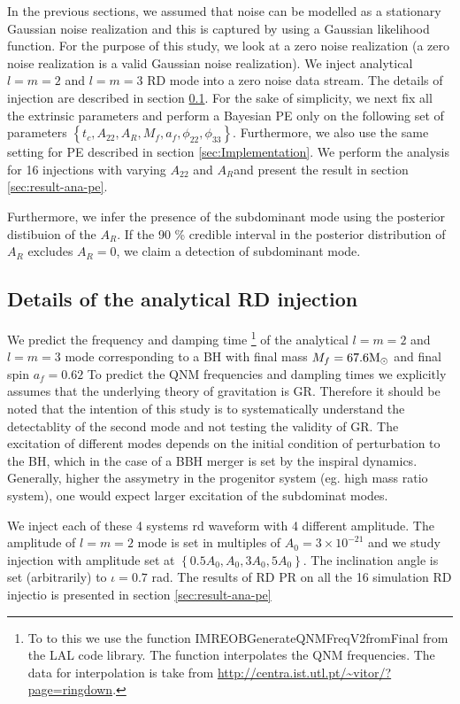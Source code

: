 In the previous sections, we assumed that noise can be modelled as a stationary Gaussian noise realization and this is captured by using a Gaussian likelihood function. For the purpose of this study, we look at a zero noise realization (a zero noise realization is a valid Gaussian noise realization). We inject analytical $l=m=2$ and $l=m=3$ RD mode into a zero noise data stream. The details of injection are described in section \ref{sec:details-of-ana-RD}. For the sake of simplicity, we next fix all the extrinsic parameters and perform a Bayesian PE only on the following set of parameters $\left\lbrace  t_{c}, A_{22}, A_{R}, M_{f}, a_{f}, \phi_{22}, \phi_{33 } \right\rbrace $. Furthermore, we also use the same setting for PE described in section \ref{sec:Implementation}.  We perform the analysis for 16 injections with varying $A_{22}$ and $A_{R}$and present the result in section \ref{sec:result-ana-pe}.

Furthermore, we infer the presence of the subdominant mode using the posterior distibuion of the $A_{R}$. If the 90 \% credible interval in the posterior distribution of $A_{R}$ excludes $A_{R} =0$, we claim a detection of subdominant mode. 

\subsection{Details of the analytical RD injection}
\label{sec:details-of-ana-RD}
We predict the frequency and damping time \footnote{To to this we use the function IMREOBGenerateQNMFreqV2fromFinal from the LAL code library. The function interpolates the QNM frequencies. The data for interpolation is take from \url{http://centra.ist.utl.pt/~vitor/?page=ringdown}.} of the analytical $l=m=2$ and $l=m=3$ mode corresponding to a BH with final mass $M_{f}=67.6 \mathrm{M}_\odot$ and final spin $a_{f}=0.62$ To predict the QNM frequencies and dampling times we explicitly assumes that the underlying theory of gravitation is GR. Therefore it should be noted that the intention of this study is to systematically understand the detectablity of the second mode and not testing the validity of GR. The excitation of different modes depends on the initial condition of perturbation to the BH, which in the case of a BBH merger is set by the inspiral dynamics. Generally, higher the assymetry in the progenitor system (eg. high mass ratio system), one would expect larger excitation of the subdominat modes. 

We inject each of these 4 systems rd waveform with 4 different amplitude. The amplitude of $l=m=2$ mode is set in multiples of $A_{0}= 3 \times 10^{-21}$ and we study injection with amplitude set at $\left\lbrace 0.5 A_{0}, A_{0}, 3A_{0}, 5A_{0}\right\rbrace $. The inclination angle is set (arbitrarily) to $\iota=0.7$ rad. The results of RD PR on all the 16 simulation RD injectio is presented in section \ref{sec:result-ana-pe}


